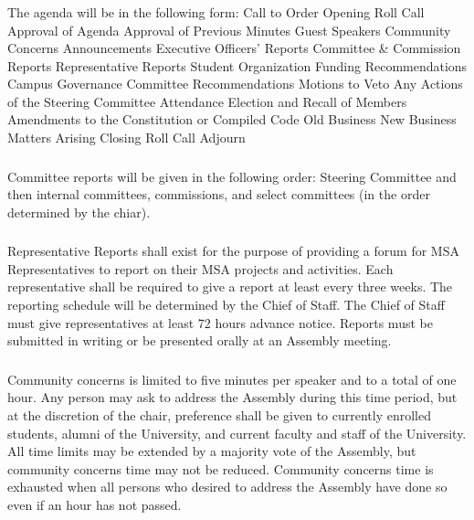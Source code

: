 \subsubsection{}
The agenda will be in the following form:
\subsubsubsection{}
Call to Order
\subsubsubsection{}
Opening Roll Call
\subsubsubsection{}
Approval of Agenda
\subsubsubsection{}
Approval of Previous Minutes
\subsubsubsection{}
Guest Speakers
\subsubsubsection{}
Community Concerns
\subsubsubsection{}
Announcements
\subsubsubsection{}
Executive Officers’ Reports
\subsubsubsection{}
Committee \& Commission Reports
\subsubsubsection{}
Representative Reports
\subsubsubsection{}
Student Organization Funding Recommendations
\subsubsubsection{}
Campus Governance Committee Recommendations
\subsubsubsection{}
Motions to Veto Any Actions of the Steering Committee
\subsubsubsubsection{}
Attendance
\subsubsubsection{}
Election and Recall of Members
\subsubsubsection{}
Amendments to the Constitution or Compiled Code
\subsubsubsection{}
Old Business
\subsubsubsection{}
New Business
\subsubsubsection{}
Matters Arising
\subsubsubsection{}
Closing Roll Call
\subsubsubsection{}
Adjourn

\subsubsection{}
Committee reports will be given in the following order: Steering Committee and then internal committees, commissions, and select committees (in the order determined by the chiar).

\subsubsection{}
Representative Reports shall exist for the purpose of providing a forum for MSA Representatives to report on their MSA  projects and activities.  Each representative shall be required to give a report at least every three weeks.  The reporting schedule will be determined by the Chief of Staff.  The Chief of Staff must give representatives at least 72 hours advance notice.  Reports must be submitted in writing or be presented orally at an Assembly meeting.

\subsubsection{}
Community concerns is limited to five minutes per speaker and to a total of one hour.  Any person may ask to address the Assembly during this time period, but at the discretion of the chair, preference shall be given to currently enrolled students, alumni of the University, and current faculty and staff of the University.  All time limits may be extended by a majority vote of the Assembly, but community concerns time may not be reduced.  Community concerns time is exhausted when all persons who desired to address the Assembly have done so even if an hour has not passed.

